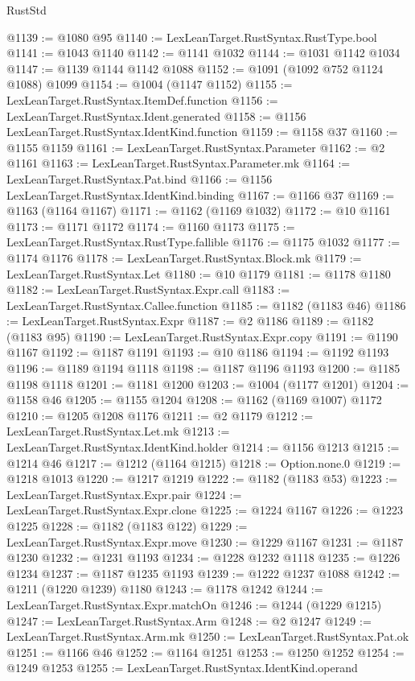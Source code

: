 \begin{lexlean}{RustStd}
\begin{coremodule}
@1139 := @1080 @95
@1140 := LexLeanTarget.RustSyntax.RustType.bool
@1141 := @1043 @1140
@1142 := @1141 @1032
@1144 := @1031 @1142 @1034
@1147 := @1139 @1144 @1142 @1088
@1152 := @1091 (@1092 @752 @1124 @1088) @1099
@1154 := @1004 (@1147 @1152)
@1155 := LexLeanTarget.RustSyntax.ItemDef.function
@1156 := LexLeanTarget.RustSyntax.Ident.generated
@1158 := @1156 LexLeanTarget.RustSyntax.IdentKind.function
@1159 := @1158 @37
@1160 := @1155 @1159
@1161 := LexLeanTarget.RustSyntax.Parameter
@1162 := @2 @1161
@1163 := LexLeanTarget.RustSyntax.Parameter.mk
@1164 := LexLeanTarget.RustSyntax.Pat.bind
@1166 := @1156 LexLeanTarget.RustSyntax.IdentKind.binding
@1167 := @1166 @37
@1169 := @1163 (@1164 @1167)
@1171 := @1162 (@1169 @1032)
@1172 := @10 @1161
@1173 := @1171 @1172
@1174 := @1160 @1173
@1175 := LexLeanTarget.RustSyntax.RustType.fallible
@1176 := @1175 @1032
@1177 := @1174 @1176
@1178 := LexLeanTarget.RustSyntax.Block.mk
@1179 := LexLeanTarget.RustSyntax.Let
@1180 := @10 @1179
@1181 := @1178 @1180
@1182 := LexLeanTarget.RustSyntax.Expr.call
@1183 := LexLeanTarget.RustSyntax.Callee.function
@1185 := @1182 (@1183 @46)
@1186 := LexLeanTarget.RustSyntax.Expr
@1187 := @2 @1186
@1189 := @1182 (@1183 @95)
@1190 := LexLeanTarget.RustSyntax.Expr.copy
@1191 := @1190 @1167
@1192 := @1187 @1191
@1193 := @10 @1186
@1194 := @1192 @1193
@1196 := @1189 @1194 @1118
@1198 := @1187 @1196 @1193
@1200 := @1185 @1198 @1118
@1201 := @1181 @1200
@1203 := @1004 (@1177 @1201)
@1204 := @1158 @46
@1205 := @1155 @1204
@1208 := @1162 (@1169 @1007) @1172
@1210 := @1205 @1208 @1176
@1211 := @2 @1179
@1212 := LexLeanTarget.RustSyntax.Let.mk
@1213 := LexLeanTarget.RustSyntax.IdentKind.holder
@1214 := @1156 @1213
@1215 := @1214 @46
@1217 := @1212 (@1164 @1215)
@1218 := Option.none.{0}
@1219 := @1218 @1013
@1220 := @1217 @1219
@1222 := @1182 (@1183 @53)
@1223 := LexLeanTarget.RustSyntax.Expr.pair
@1224 := LexLeanTarget.RustSyntax.Expr.clone
@1225 := @1224 @1167
@1226 := @1223 @1225
@1228 := @1182 (@1183 @122)
@1229 := LexLeanTarget.RustSyntax.Expr.move
@1230 := @1229 @1167
@1231 := @1187 @1230
@1232 := @1231 @1193
@1234 := @1228 @1232 @1118
@1235 := @1226 @1234
@1237 := @1187 @1235 @1193
@1239 := @1222 @1237 @1088
@1242 := @1211 (@1220 @1239) @1180
@1243 := @1178 @1242
@1244 := LexLeanTarget.RustSyntax.Expr.matchOn
@1246 := @1244 (@1229 @1215)
@1247 := LexLeanTarget.RustSyntax.Arm
@1248 := @2 @1247
@1249 := LexLeanTarget.RustSyntax.Arm.mk
@1250 := LexLeanTarget.RustSyntax.Pat.ok
@1251 := @1166 @46
@1252 := @1164 @1251
@1253 := @1250 @1252
@1254 := @1249 @1253
@1255 := LexLeanTarget.RustSyntax.IdentKind.operand

\end{coremodule}
\end{lexlean}

